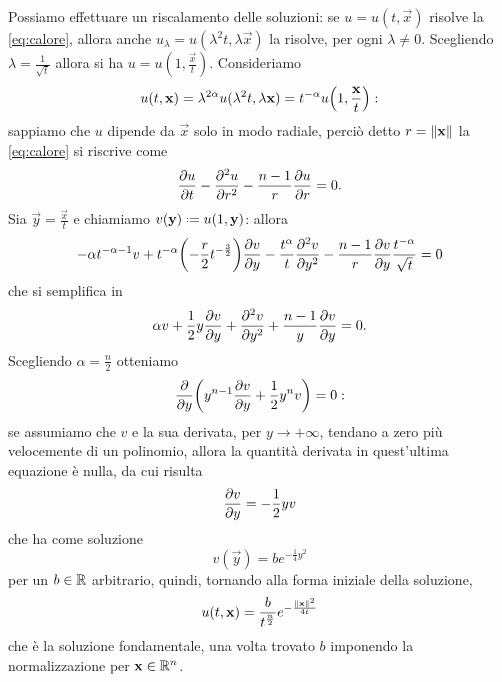 Possiamo effettuare un riscalamento delle soluzioni: se $u=u(t,\vec x)$ risolve la \eqref{eq:calore}, allora anche $u_\lambda=u(\lambda^2 t,\lambda\vec x)$ la risolve, per ogni $\lambda\ne 0$.
Scegliendo $\lambda=\frac1{\sqrt{t}}$ allora si ha $u=u(1,\frac{\vec x}{t})$.
Consideriamo
\begin{equation}
    u(t,\vec x)=
    \lambda^{2\alpha}u(\lambda^2 t,\lambda\vec x)=
    t^{-\alpha}u\Bigl(1,\frac{\vec x}{t}\Bigr):
\end{equation}
sappiamo che $u$ dipende da $\vec x$ solo in modo radiale, perciò detto $r=\norm{\vec x}$ la \eqref{eq:calore} si riscrive come
\begin{equation}
    \drp{u}{t}-\ddrp{u}{r}-\frac{n-1}{r}\drp{u}{r}=0.
    \label{eq:calore-radiale}
\end{equation}
Sia $\vec y=\frac{\vec x}{t}$ e chiamiamo $v(\vec y)\defeq u(1,\vec y)$: allora
\begin{equation}
    -\alpha t^{-\alpha-1}v+t^{-\alpha}\biggl(-\frac{r}2t^{-\frac{3}{2}}\biggr)\drp{v}{y}-\frac{t^\alpha}{t}\ddrp{v}{y}-\frac{n-1}{r}\drp{v}{y}\frac{t^{-\alpha}}{\sqrt{t}}=0
\end{equation}
che si semplifica in
\begin{equation}
    \alpha v+\frac12y\drp{v}{y}+\ddrp{v}{y}+\frac{n-1}{y}\drp{v}{y}=0.
\end{equation}
Scegliendo $\alpha=\frac{n}2$ otteniamo
\begin{equation}
    \drp{}{y}\biggl(y^{n-1}\drp{v}{y}+\frac12y^nv\biggr)=0:
\end{equation}
se assumiamo che $v$ e la sua derivata, per $y\to+\infty$, tendano a zero più velocemente di un polinomio, allora la quantità derivata in quest'ultima equazione è nulla, da cui risulta
\begin{equation}
    \drp{v}{y}=-\frac12yv
\end{equation}
che ha come soluzione
\begin{equation}
    v(\vec y)=be^{-\frac14y^2}
\end{equation}
per un $b\in\R$ arbitrario, quindi, tornando alla forma iniziale della soluzione,
\begin{equation}
    u(t,\vec x)=\frac{b}{t^\frac{n}2}e^{-\frac{\norm{\vec x}^2}{4t}}
\end{equation}
che è la soluzione fondamentale, una volta trovato $b$ imponendo la normalizzazione per $\vec x\in\R^n$.

